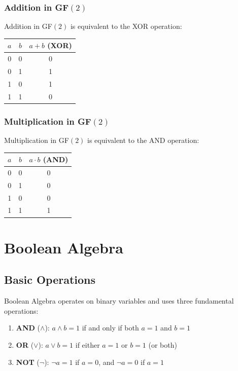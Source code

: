 \documentclass[11pt,a4paper]{article}
\begin{document}
\subsubsection{Addition in GF$(2)$}

Addition in GF$(2)$ is equivalent to the XOR operation:

\begin{center}
\begin{tabular}{|c|c|c|}
\hline
$a$ & $b$ & $a + b$ (XOR) \\
\hline
0 & 0 & 0 \\
0 & 1 & 1 \\
1 & 0 & 1 \\
1 & 1 & 0 \\
\hline
\end{tabular}
\end{center}

\subsubsection{Multiplication in GF$(2)$}

Multiplication in GF$(2)$ is equivalent to the AND operation:

\begin{center}
\begin{tabular}{|c|c|c|}
\hline
$a$ & $b$ & $a \cdot b$ (AND) \\
\hline
0 & 0 & 0 \\
0 & 1 & 0 \\
1 & 0 & 0 \\
1 & 1 & 1 \\
\hline
\end{tabular}
\end{center}

\section{Boolean Algebra}

\subsection{Basic Operations}

Boolean Algebra operates on binary variables and uses three fundamental operations:

\begin{enumerate}
    \item \textbf{AND} ($\wedge$): $a \wedge b = 1$ if and only if both $a = 1$ and $b = 1$
    \item \textbf{OR} ($\vee$): $a \vee b = 1$ if either $a = 1$ or $b = 1$ (or both)
    \item \textbf{NOT} ($\neg$): $\neg a = 1$ if $a = 0$, and $\neg a = 0$ if $a = 1$
\end{enumerate}
\end{document}
